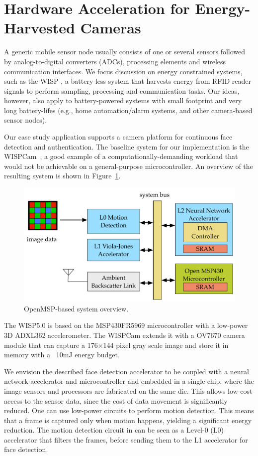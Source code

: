 \section{Hardware Acceleration for Energy-Harvested Cameras}

A generic mobile sensor node usually consists of one or several sensors followed by analog-to-digital converters (ADCs), processing elements and wireless communication interfaces. We focus discussion on energy constrained systems, such as the WISP \cite{wisp}, a battery-less system that  harvests energy from RFID reader signals to perform sampling, processing and communication tasks. Our ideas, however, also apply to battery-powered systems with small footprint and very long battery-lifes (e.g., home automation/alarm systems, and other camera-based sensor nodes).

Our case study application supports a camera platform for continuous face detection and authentication. The baseline system for our implementation is the WISPCam~\cite{wispcam}, a good example of a computationally-demanding workload that would not be achievable on a general-purpose microcontroller.
An overview of the resulting system is shown in Figure~\ref{fig:OMSP}.

\begin{figure}
  \centering
  \includegraphics[width=.7\textwidth]{nsp-figs/system_overview.pdf}
  \caption{OpenMSP-based system overview. }
  \label{fig:OMSP}
\end{figure}


The WISP5.0 is based on the MSP430FR5969 microcontroller with a low-power 3D ADXL362 accelerometer. The WISPCam extends it with a OV7670 camera module that can capture a 176$\times$144 pixel gray scale image and store it in memory with a ~10mJ energy budget.

We envision the described face detection accelerator to be coupled with a neural network accelerator and microcontroller and embedded in a single chip, where the image sensors and processors are fabricated on the same die. This allows low-cost access to the sensor data, since the cost of data movement is significantly reduced. One can use low-power circuits to perform motion detection. This means that a frame is captured only when motion happens, yielding a significant energy reduction. The motion detection circuit in \cite{multipower-isscc13} can be seen as a Level-0 (L0) accelerator that filters the frames, before sending them to the L1 accelerator for face detection.

